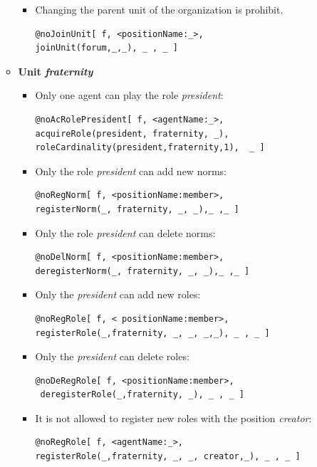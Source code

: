 \begin{enumerate}
\begin{itemize}
\begin{itemize}
\item Changing the parent unit of the organization is prohibit.  
\begin{verbatim}
@noJoinUnit[ f, <positionName:_>, 
joinUnit(forum,_,_), _ , _ ] 
\end{verbatim}

\end{itemize}

\item \textbf{Unit \textit{fraternity}}
\begin{itemize}
\item Only one agent can play the role \textit{president}:
\begin{verbatim}
@noAcRolePresident[ f, <agentName:_>, 
acquireRole(president, fraternity, _),
roleCardinality(president,fraternity,1),  _ ] 
\end{verbatim}

\item Only the role \textit{president} can add new norms:
\begin{verbatim}
@noRegNorm[ f, <positionName:member>, 
registerNorm(_, fraternity, _, _),_ ,_ ] 
\end{verbatim}

\item Only the role \textit{president} can delete norms:
\begin{verbatim}
@noDelNorm[ f, <positionName:member>, 
deregisterNorm(_, fraternity, _, _),_ ,_ ] 
\end{verbatim}

\item Only the  \textit{president} can add new roles:
\begin{verbatim}
@noRegRole[ f, < positionName:member>, 
registerRole(_,fraternity, _, _, _,_), _ , _ ] 
\end{verbatim}

\item Only the  \textit{president} can delete roles:
\begin{verbatim}
@noDeRegRole[ f, <positionName:member>,
 deregisterRole(_,fraternity, _), _ , _ ] 
\end{verbatim}

\item It is not allowed to register new roles with the position \textit{creator}:
\begin{verbatim}
@noRegRole[ f, <agentName:_>, 
registerRole(_,fraternity, _, _, creator,_), _ , _ ] 
\end{verbatim}



\end{itemize}
\end{itemize}
\end{enumerate}
